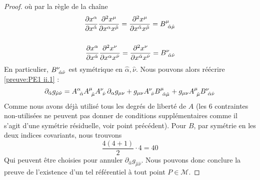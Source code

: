 \begin{proof}
où par la règle de la chaîne 
\begin{align}
    \frac{\partial x^{\alpha}}{\partial x^{\hat{\alpha}}} \frac{\partial^2 x^{\mu}}{\partial x^{\alpha}x^{\hat{\mu}}} = \frac{\partial^2 x^{\mu}}{\partial x^{\hat{\alpha}}x^{\hat{\mu}}} = B\indices{^{\mu}_{\!\hat{\alpha} \hat{\mu}}}\\
    \nonumber
    \, \\
    \frac{\partial x^{\alpha}}{\partial x^{\hat{\alpha}}} \frac{\partial^2 x^{\nu}}{\partial x^{\alpha}x^{\hat{\nu}}} = \frac{\partial^2 x^{\nu}}{\partial x^{\hat{\alpha}}x^{\hat{\nu}}} = B\indices{^{\nu}_{\!\hat{\alpha} \hat{\nu}}}
\end{align}
En particulier, $B\indices{^{\nu}_{\!\hat{\alpha} \hat{\nu}}}$ est symétrique en $\hat{\alpha}, \hat{\nu}$. Nous pouvons alors réécrire \ref{preuve:PE1 ii.1} :
\begin{equation}
    \partial_{\hat{\alpha}}g_{\hat{\mu}\hat{\nu}} = A\indices{^{\alpha}_{\!\hat{\alpha}}} A\indices{^{\mu}_{\!\hat{\mu}}} A\indices{^{\nu}_{\!\hat{\nu}}}\, \partial_{\alpha} g_{\mu \nu} + g_{\mu \nu}A\indices{^{\nu}_{\!\hat{\nu}}} B\indices{^{\mu}_{\!\hat{\alpha} \hat{\mu}}} + g_{\mu \nu}A\indices{^{\mu}_{\!\hat{\mu}}}B\indices{^{\nu}_{\!\hat{\alpha} \hat{\nu}}} 
\end{equation}
Comme nous avons déjà utilisé tous les degrés de liberté de $A$ (les 6 contraintes non-utilisées ne peuvent pas donner de conditions supplémentaires comme il s'agit d'une symétrie résiduelle, voir point précédent). Pour $B$, par symétrie en les deux indices covariants, nous trouvons 
\begin{equation}
    \frac{4(4+1)}{2} \cdot 4 = 40
\end{equation}
Qui peuvent être choisies pour annuler $\partial_{\hat{\alpha}}g_{\hat{\mu}\hat{\nu}}$. Nous pouvons donc conclure la preuve de l'existence d'un tel référentiel à tout point $P\in \mathcal{M}$.
\end{proof}
